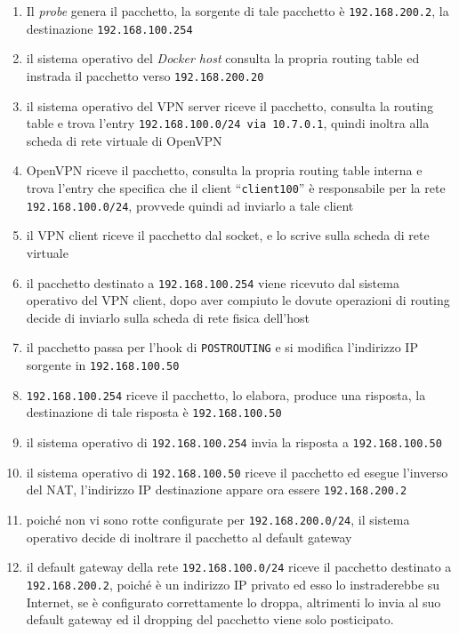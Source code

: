 \begin{enumerate}
  \item Il \textit{probe} genera il pacchetto, la sorgente di tale pacchetto è
  \texttt{192.168.200.2}, la destinazione \texttt{192.168.100.254}
  \item il sistema operativo del \textit{Docker host} consulta la propria routing table
  ed instrada il pacchetto verso \texttt{192.168.200.20}
  \item il sistema operativo del VPN server riceve il pacchetto, consulta la
  routing table e trova l'entry \texttt{192.168.100.0/24 via 10.7.0.1}, quindi inoltra
  alla scheda di rete virtuale di OpenVPN
  \item OpenVPN riceve il pacchetto, consulta la propria routing table interna e
  trova l'entry che specifica che il client ``\texttt{client100}'' è responsabile per
  la rete \texttt{192.168.100.0/24}, provvede quindi ad inviarlo a tale client
  \item il VPN client riceve il pacchetto dal socket, e lo scrive sulla scheda di rete
  virtuale
  \item il pacchetto destinato a \texttt{192.168.100.254} viene ricevuto dal sistema
  operativo del VPN client, dopo aver compiuto le dovute operazioni di routing decide
  di inviarlo
  sulla scheda di rete fisica dell'host
  \item il pacchetto passa per l'hook di \texttt{POSTROUTING} e si modifica l'indirizzo IP
  sorgente in \texttt{192.168.100.50}
  \item \texttt{192.168.100.254} riceve il pacchetto, lo elabora, produce una risposta,
  la destinazione di tale risposta è \texttt{192.168.100.50}
  \item il sistema operativo di \texttt{192.168.100.254} invia la risposta a
  \texttt{192.168.100.50}
  \item il sistema operativo di \texttt{192.168.100.50} riceve il pacchetto ed
  esegue l'inverso del NAT, l'indirizzo IP destinazione appare ora essere \texttt{192.168.200.2}
  \item poiché non vi sono rotte configurate per \texttt{192.168.200.0/24}, il sistema
  operativo decide di inoltrare il pacchetto al default gateway
  \item il default gateway della rete \texttt{192.168.100.0/24} riceve il pacchetto
  destinato a \texttt{192.168.200.2}, poiché è un indirizzo IP privato ed esso
  lo instraderebbe su Internet, se è configurato correttamente lo droppa, altrimenti
  lo invia al suo default gateway ed il dropping del pacchetto viene solo posticipato.
\end{enumerate}

